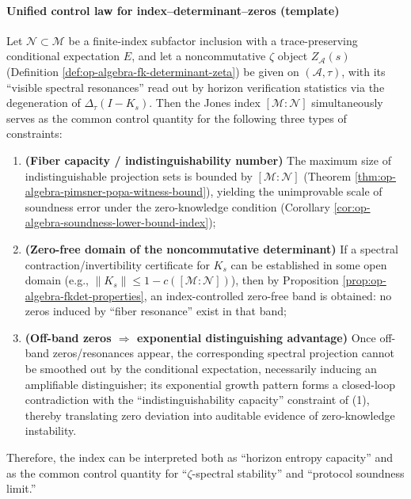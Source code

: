 \paragraph{Unified control law for index--determinant--zeros (template)}
\begin{proposition}\label{prop:op-algebra-index-determinant-zero-control}
Let \(\mathcal{N}\subset\mathcal{M}\) be a finite-index subfactor inclusion with a trace-preserving conditional expectation \(E\), and let a noncommutative \(\zeta\) object \(Z_{\mathcal{A}}(s)\) (Definition \ref{def:op-algebra-fk-determinant-zeta}) be given on \((\mathcal{A},\tau)\),
with its ``visible spectral resonances'' read out by horizon verification statistics via the degeneration of \(\Delta_\tau(I-K_s)\).
Then the Jones index \([\mathcal{M}:\mathcal{N}]\) simultaneously serves as the common control quantity for the following three types of constraints:
\begin{enumerate}
  \item \textbf{(Fiber capacity / indistinguishability number)} The maximum size of indistinguishable projection sets is bounded by \([\mathcal{M}:\mathcal{N}]\) (Theorem \ref{thm:op-algebra-pimsner-popa-witness-bound}), yielding the unimprovable scale of soundness error under the zero-knowledge condition (Corollary \ref{cor:op-algebra-soundness-lower-bound-index});
  \item \textbf{(Zero-free domain of the noncommutative determinant)} If a spectral contraction/invertibility certificate for \(K_s\) can be established in some open domain (e.g., \(\|K_s\|\le 1-c([\mathcal{M}:\mathcal{N}])\)), then by Proposition \ref{prop:op-algebra-fkdet-properties}, an index-controlled zero-free band is obtained: no zeros induced by ``fiber resonance'' exist in that band;
  \item \textbf{(Off-band zeros \(\Rightarrow\) exponential distinguishing advantage)} Once off-band zeros/resonances appear, the corresponding spectral projection cannot be smoothed out by the conditional expectation, necessarily inducing an amplifiable distinguisher; its exponential growth pattern forms a closed-loop contradiction with the ``indistinguishability capacity'' constraint of (1), thereby translating zero deviation into auditable evidence of zero-knowledge instability.
\end{enumerate}
Therefore, the index can be interpreted both as ``horizon entropy capacity'' and as the common control quantity for ``\(\zeta\)-spectral stability'' and ``protocol soundness limit.''
\end{proposition}

\endinput



